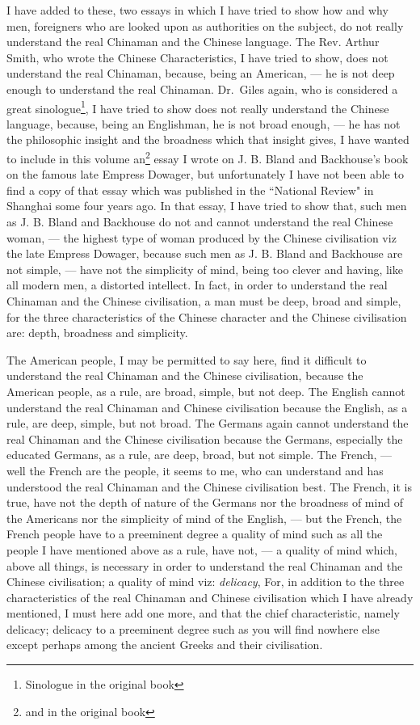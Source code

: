 I have added to these, two essays in which I have tried to show how and why men, foreigners who are looked upon as authorities on the subject, do not really understand the real Chinaman and the Chinese language.
The Rev. Arthur Smith, who wrote the Chinese Characteristics, I have tried to show, does not understand the real Chinaman, because, being an American, --- he is not deep enough to understand the real Chinaman.
Dr.~Giles again, who is considered a great sinologue\footnote{Sinologue in the original book}, I have tried to show does not really understand the Chinese language, because, being an Englishman, he is not broad enough, --- he has not the philosophic insight and the broadness which that insight gives, I have wanted to include in this volume an\footnote{and in the original book} essay I wrote on J. B. Bland and Backhouse's book on the famous late Empress Dowager, but unfortunately I have not been able to find a copy of that essay which was published in the ``National Review" in Shanghai some four years ago.
In that essay, I have tried to show that, such men as J. B. Bland and Backhouse do not and cannot understand the real Chinese woman, --- the highest type of woman produced by the Chinese civilisation viz the late Empress Dowager, because such men as J. B. Bland and Backhouse are not simple, --- have not the simplicity of mind, being too clever and having, like all modern men, a distorted intellect\cite{num1}. 
In fact, in order to understand the real Chinaman and the Chinese civilisation, a man must be deep, broad and simple, for the three characteristics of the Chinese character and the Chinese civilisation are: depth, broadness and simplicity.

The American people, I may be permitted to say here, find it difficult to understand the real Chinaman and the Chinese civilisation, because the American people, as a rule, are broad, simple, but not deep.
The English cannot understand the real Chinaman and Chinese civilisation because the English, as a rule, are deep, simple, but not broad.
The Germans again cannot understand the real Chinaman and the Chinese civilisation because the Germans, especially the educated Germans, as a rule, are deep, broad, but not simple.
The French, --- well the French are the people, it seems to me, who can understand and has understood the real Chinaman and the Chinese civilisation best\cite{num2}. 
The French, it is true, have not the depth of nature of the Germans nor the broadness of mind of the Americans nor the simplicity of mind of the English, --- but the French, the French people have to a preeminent degree a quality of mind such as all the people I have mentioned above as a rule, have not, --- a quality of mind which, above all things, is necessary in order to understand the real Chinaman and the Chinese civilisation; a quality of mind viz: \emph{delicacy}, For, in addition to the three characteristics of the real Chinaman and Chinese civilisation which I have already mentioned, I must here add one more, and that the chief characteristic, namely delicacy; delicacy to a preeminent  degree such as you will find nowhere else except perhaps among the ancient Greeks and their civilisation.

